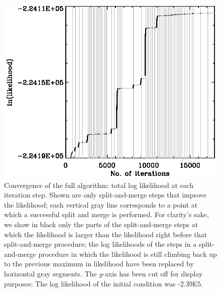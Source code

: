 \documentclass[aoas,preprint,authoryear,round]{imsart}
\begin{document}
\clearpage
\begin{figure}
\centering
\includegraphics{conv_10_4.ps}
\caption{Convergence of the full algorithm: total log likelihood at
  each iteration step. Shown are only split-and-merge steps that
  improve the likelihood; each vertical gray line corresponds to a
  point at which a successful split and merge is performed. For
  clarity's sake, we show in black only the parts of the
  split-and-merge steps at which the likelihood is larger than the
  likelihood right before that split-and-merge procedure; the log
  likelihoods of the steps in a split-and-merge procedure in which the
  likelihood is still climbing back up to the previous maximum in
  likelihood have been replaced by horizontal gray segments. The
  $y$-axis has been cut off for display purposes: The log likelihood
  of the initial condition was -2.39E5.}\label{fig:convergence}%
\end{figure}
\end{document}
